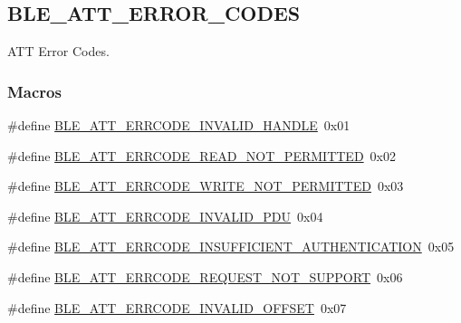 \hypertarget{group___b_l_e___a_t_t___e_r_r_o_r___c_o_d_e_s}{}\subsection{B\+L\+E\+\_\+\+A\+T\+T\+\_\+\+E\+R\+R\+O\+R\+\_\+\+C\+O\+D\+ES}
\label{group___b_l_e___a_t_t___e_r_r_o_r___c_o_d_e_s}


A\+TT Error Codes.  


\subsubsection*{Macros}
\begin{DoxyCompactItemize}
\item 
\#define \hyperlink{group___b_l_e___a_t_t___e_r_r_o_r___c_o_d_e_s_ga174babe6fe466295f2129ba8a3f31545}{B\+L\+E\+\_\+\+A\+T\+T\+\_\+\+E\+R\+R\+C\+O\+D\+E\+\_\+\+I\+N\+V\+A\+L\+I\+D\+\_\+\+H\+A\+N\+D\+LE}~0x01
\item 
\#define \hyperlink{group___b_l_e___a_t_t___e_r_r_o_r___c_o_d_e_s_ga1c46fda86bfa1f553fe36eab68105424}{B\+L\+E\+\_\+\+A\+T\+T\+\_\+\+E\+R\+R\+C\+O\+D\+E\+\_\+\+R\+E\+A\+D\+\_\+\+N\+O\+T\+\_\+\+P\+E\+R\+M\+I\+T\+T\+ED}~0x02
\item 
\#define \hyperlink{group___b_l_e___a_t_t___e_r_r_o_r___c_o_d_e_s_gaaf157583d955a24b347b0261c8daa2e8}{B\+L\+E\+\_\+\+A\+T\+T\+\_\+\+E\+R\+R\+C\+O\+D\+E\+\_\+\+W\+R\+I\+T\+E\+\_\+\+N\+O\+T\+\_\+\+P\+E\+R\+M\+I\+T\+T\+ED}~0x03
\item 
\#define \hyperlink{group___b_l_e___a_t_t___e_r_r_o_r___c_o_d_e_s_ga035be309210c4b2c47f1d8d3e5c52005}{B\+L\+E\+\_\+\+A\+T\+T\+\_\+\+E\+R\+R\+C\+O\+D\+E\+\_\+\+I\+N\+V\+A\+L\+I\+D\+\_\+\+P\+DU}~0x04
\item 
\#define \hyperlink{group___b_l_e___a_t_t___e_r_r_o_r___c_o_d_e_s_gadc6e3af6fc4c4ef132b5c6fd75c3ed51}{B\+L\+E\+\_\+\+A\+T\+T\+\_\+\+E\+R\+R\+C\+O\+D\+E\+\_\+\+I\+N\+S\+U\+F\+F\+I\+C\+I\+E\+N\+T\+\_\+\+A\+U\+T\+H\+E\+N\+T\+I\+C\+A\+T\+I\+ON}~0x05
\item 
\#define \hyperlink{group___b_l_e___a_t_t___e_r_r_o_r___c_o_d_e_s_ga803397ceb3700af4a975416188a47c5b}{B\+L\+E\+\_\+\+A\+T\+T\+\_\+\+E\+R\+R\+C\+O\+D\+E\+\_\+\+R\+E\+Q\+U\+E\+S\+T\+\_\+\+N\+O\+T\+\_\+\+S\+U\+P\+P\+O\+RT}~0x06
\item 
\#define \hyperlink{group___b_l_e___a_t_t___e_r_r_o_r___c_o_d_e_s_ga6618e07235b2fe2ee65c3a37dace6669}{B\+L\+E\+\_\+\+A\+T\+T\+\_\+\+E\+R\+R\+C\+O\+D\+E\+\_\+\+I\+N\+V\+A\+L\+I\+D\+\_\+\+O\+F\+F\+S\+ET}~0x07

\end{DoxyCompactItemize}
